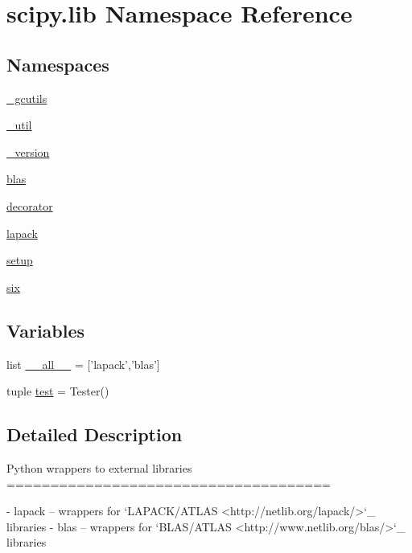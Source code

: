 \hypertarget{namespacescipy_1_1lib}{}\section{scipy.\+lib Namespace Reference}
\label{namespacescipy_1_1lib}
\subsection*{Namespaces}
\begin{DoxyCompactItemize}
\item 
 \hyperlink{namespacescipy_1_1lib_1_1__gcutils}{\+\_\+gcutils}
\item 
 \hyperlink{namespacescipy_1_1lib_1_1__util}{\+\_\+util}
\item 
 \hyperlink{namespacescipy_1_1lib_1_1__version}{\+\_\+version}
\item 
 \hyperlink{namespacescipy_1_1lib_1_1blas}{blas}
\item 
 \hyperlink{namespacescipy_1_1lib_1_1decorator}{decorator}
\item 
 \hyperlink{namespacescipy_1_1lib_1_1lapack}{lapack}
\item 
 \hyperlink{namespacescipy_1_1lib_1_1setup}{setup}
\item 
 \hyperlink{namespacescipy_1_1lib_1_1six}{six}
\end{DoxyCompactItemize}
\subsection*{Variables}
\begin{DoxyCompactItemize}
\item 
list \hyperlink{namespacescipy_1_1lib_a32d465836b84be516f414d054bdf2745}{\+\_\+\+\_\+all\+\_\+\+\_\+} = \mbox{[}'lapack','blas'\mbox{]}
\item 
tuple \hyperlink{namespacescipy_1_1lib_a675252b0c93dc0d6ab96541d2bf65291}{test} = Tester()
\end{DoxyCompactItemize}


\subsection{Detailed Description}
\begin{DoxyVerb}Python wrappers to external libraries
=====================================

- lapack -- wrappers for `LAPACK/ATLAS <http://netlib.org/lapack/>`_
        libraries
- blas -- wrappers for `BLAS/ATLAS <http://www.netlib.org/blas/>`_
      libraries\end{DoxyVerb}
 

